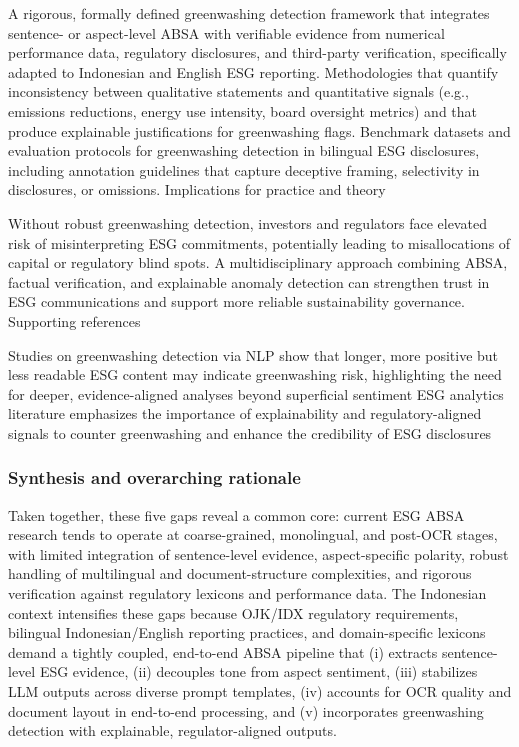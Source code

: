 A rigorous, formally defined greenwashing detection framework that integrates sentence- or aspect-level ABSA with verifiable evidence from numerical performance data, regulatory disclosures, and third-party verification, specifically adapted to Indonesian and English ESG reporting.
Methodologies that quantify inconsistency between qualitative statements and quantitative signals (e.g., emissions reductions, energy use intensity, board oversight metrics) and that produce explainable justifications for greenwashing flags.
Benchmark datasets and evaluation protocols for greenwashing detection in bilingual ESG disclosures, including annotation guidelines that capture deceptive framing, selectivity in disclosures, or omissions.
Implications for practice and theory

Without robust greenwashing detection, investors and regulators face elevated risk of misinterpreting ESG commitments, potentially leading to misallocations of capital or regulatory blind spots.
A multidisciplinary approach combining ABSA, factual verification, and explainable anomaly detection can strengthen trust in ESG communications and support more reliable sustainability governance.
Supporting references

Studies on greenwashing detection via NLP show that longer, more positive but less readable ESG content may indicate greenwashing risk, highlighting the need for deeper, evidence-aligned analyses beyond superficial sentiment \cite{10.1111/eufm.12509}
ESG analytics literature emphasizes the importance of explainability and regulatory-aligned signals to counter greenwashing and enhance the credibility of ESG disclosures \cite{10.1002/csr.70089,10.2139/ssrn.3738629,10.1108/mf-01-2023-0020}

\subsubsection{Synthesis and overarching rationale}
Taken together, these five gaps reveal a common core: current ESG ABSA research tends to operate at coarse-grained, monolingual, and post-OCR stages, with limited integration of sentence-level evidence, aspect-specific polarity, robust handling of multilingual and document-structure complexities, and rigorous verification against regulatory lexicons and performance data. The Indonesian context intensifies these gaps because OJK/IDX regulatory requirements, bilingual Indonesian/English reporting practices, and domain-specific lexicons demand a tightly coupled, end-to-end ABSA pipeline that (i) extracts sentence-level ESG evidence, (ii) decouples tone from aspect sentiment, (iii) stabilizes LLM outputs across diverse prompt templates, (iv) accounts for OCR quality and document layout in end-to-end processing, and (v) incorporates greenwashing detection with explainable, regulator-aligned outputs.

